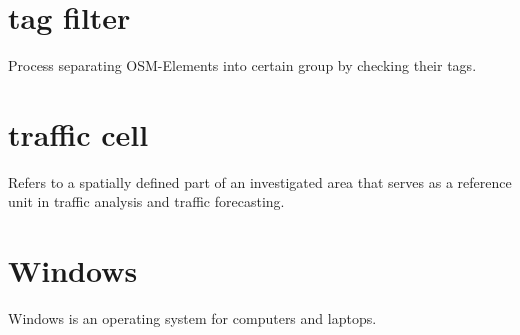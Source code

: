 \documentclass[parskip=full]{report} %
\begin{document}
\section*{tag filter}
Process separating OSM-Elements into certain group by checking their tags.

\section*{traffic cell}
Refers to a spatially defined part of an investigated area that serves as a reference unit in traffic analysis and traffic forecasting.

\section*{Windows}
Windows is an operating system for computers and laptops.
\end{document}
